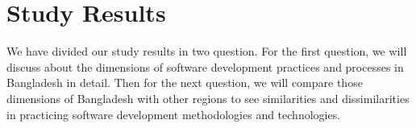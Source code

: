 \section{Study Results}
\label{study_results}

We have divided our study results in two question. For the first question, we will discuss about the dimensions of software development practices and processes in Bangladesh in detail. Then for the next question, we will compare those dimensions of Bangladesh with other regions to see similarities and dissimilarities in practicing software development methodologies and technologies.



